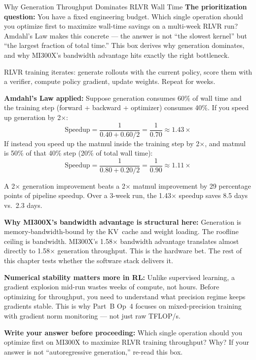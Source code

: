 \begin{thinkfirst}{Why Generation Throughput Dominates RLVR Wall Time}
\textbf{The prioritization question:} You have a fixed engineering budget. Which single operation should you optimize first to maximize wall-time savings on a multi-week RLVR run? Amdahl's Law makes this concrete --- the answer is not ``the slowest kernel'' but ``the largest fraction of total time.'' This box derives why generation dominates, and why MI300X's bandwidth advantage hits exactly the right bottleneck.

RLVR training iterates: generate rollouts with the current policy, score them with a verifier, compute policy gradient, update weights. Repeat for weeks.

\textbf{Amdahl's Law applied:} Suppose generation consumes 60\% of wall time and the training step (forward + backward + optimizer) consumes 40\%. If you speed up generation by 2$\times$:
$$\text{Speedup} = \frac{1}{0.40 + 0.60/2} = \frac{1}{0.70} \approx 1.43\times$$
If instead you speed up the matmul inside the training step by 2$\times$, and matmul is 50\% of that 40\% step (20\% of total wall time):
$$\text{Speedup} = \frac{1}{0.80 + 0.20/2} = \frac{1}{0.90} \approx 1.11\times$$

A 2$\times$ generation improvement beats a 2$\times$ matmul improvement by 29 percentage points of pipeline speedup. Over a 3-week run, the 1.43$\times$ speedup saves 8.5 days vs.\ 2.3 days.

\textbf{Why MI300X's bandwidth advantage is structural here:} Generation is memory-bandwidth-bound by the KV~cache and weight loading. The roofline ceiling is bandwidth. MI300X's 1.58$\times$ bandwidth advantage translates almost directly to 1.58$\times$ generation throughput. This is the hardware bet. The rest of this chapter tests whether the software stack delivers it.

\textbf{Numerical stability matters more in RL:} Unlike supervised learning, a gradient explosion mid-run wastes weeks of compute, not hours. Before optimizing for throughput, you need to understand what precision regime keeps gradients stable. This is why Part~B Op~4 focuses on mixed-precision training with gradient norm monitoring --- not just raw TFLOP/s.

\textbf{Write your answer before proceeding:} Which single operation should you optimize first on MI300X to maximize RLVR training throughput? Why? If your answer is not ``autoregressive generation,'' re-read this box.
\end{thinkfirst}

